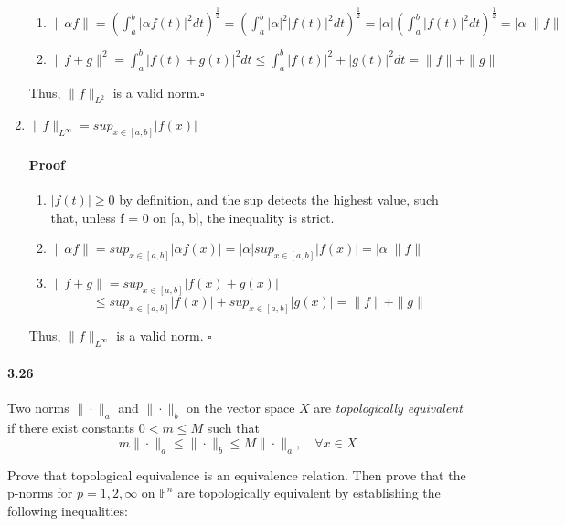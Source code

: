 \documentclass[letterpaper,12pt]{article}
\theoremstyle{definition}
\begin{document}
\begin{enumerate}[label=(\roman*)]
\begin{enumerate}
\item  $\|\alpha f\| = (\int_a^b\vert \alpha f(t) \vert^2 dt)^{\frac{1}{2}}= (\int_a^b |\alpha|^2 \vert f(t) \vert^2 dt)^{\frac{1}{2}}= |\alpha| (\int_a^b \vert f(t) \vert^2 dt)^{\frac{1}{2}} = |\alpha| \|f\| $ 
\item  $\|f + g\|^2 = \int_a^b\vert f(t) + g(t) \vert^2 dt \le \int_a^b | f(t)|^2 + |g(t)|^2 dt = \|f \| + \|g\|$
\end{enumerate}
Thus, $\| f \|_{L^{2}}$ is a valid norm.$\square$

\item $\| f \|_{L^{\infty}} = sup_{x \in [a,b]}\vert f(x) \vert$

\paragraph{Proof} 
\begin{enumerate}
\item  $\vert f(t) \vert \ge 0$ by definition, and the sup detects the highest value, such that, unless f = 0 on [a, b], the inequality is strict.  
\item  $\|\alpha f\| = sup_{x \in [a,b]}\vert \alpha f(x) \vert =  |\alpha| sup_{x \in [a,b]}\vert f(x) \vert = |\alpha| \|f\| $ 
\item  $\|f + g\| = sup_{x \in [a,b]}\vert f(x) + g(x) \vert $ $$\le sup_{x \in [a,b]}\vert f(x) \vert + sup_{x \in [a,b]}\vert g(x) \vert = \|f \| + \|g\|$$
\end{enumerate}
Thus, $\| f \|_{L^{\infty}}$ is a valid norm. $\square$

\end{enumerate}



\paragraph{3.26} 


Two norms  $ \| \cdot \|_a$ and $ \| \cdot \|_b $ on the vector space $X$ are  \emph{topologically equivalent} if there exist constants $ 0 < m \le M$ such that 
$$ m \|\cdot\|_a \le \|\cdot\|_b \le M \|\cdot\|_a, \quad\forall x \in X $$

Prove that topological equivalence is an equivalence relation. Then prove that the p-norms for $p =  1, 2, \infty$ on $\mathds{F}^n$ are topologically equivalent by establishing the following inequalities:
\end{document}
